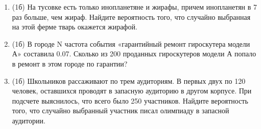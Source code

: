 \documentclass[a4paper, 12pt]{article}
\begin{document}
\begin{enumerate}
\item (1б) На тусовке есть только инопланетяне и жирафы, причем инопланетян в 7 раз больше, чем жираф. Найдите вероятность того, 
что случайно выбранная на этой ферме тварь окажется жирафой.

\item (1б) В городе N частота события «гарантийный ремонт гироскутера модели А» составила 0.07. 
Сколько из 200 проданных гироскутеров модели А попало в ремонт в этом городе по гарантии?

\item (1б) Школьников рассаживают по трем аудиториям. В первых двух по 120 человек, оставшихся проводят в запасную аудиторию в другом корпусе. 
При подсчете выяснилось, что всего было 250 участников. Найдите вероятность того, что случайно выбранный участник писал олимпиаду в запасной аудитории.

        


\end{enumerate}
\end{document}
